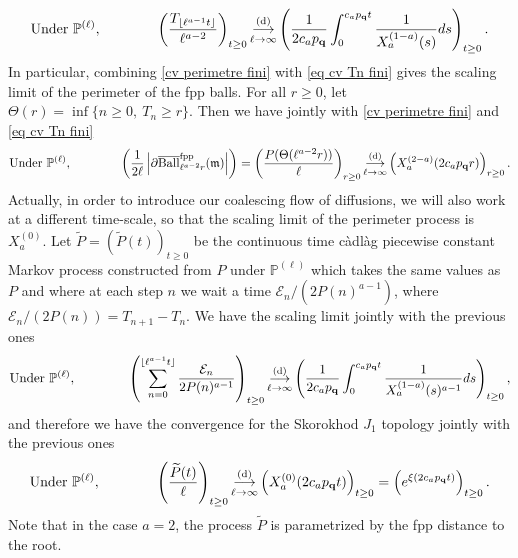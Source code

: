 \documentclass[11pt]{article}
\numberwithin{equation}{section}
\def\P{\mathbb{P}}
\begin{document}
\begin{equation}\label{eq cv Tn fini}
	\text{Under }\P^{(\ell)}, \qquad \qquad
	\left(\frac{T_{\lfloor \ell^{a-1} t \rfloor}}{\ell^{a-2}}
	\right)_{t\ge 0}
	\mathop{\longrightarrow}\limits_{\ell \to \infty}^{(\mathrm{d})}
	\left(\frac{1}{2 c_a p_{\bf q}} \int_0^{c_a p_{\bf q} t} \frac{1}{X^{(1-a)}_a(s)}ds\right)_{t\ge 0}.
\end{equation}
In particular, combining \eqref{cv perimetre fini} with \eqref{eq cv Tn fini} gives the scaling limit of the perimeter of the fpp balls. For all $r\ge 0$, let $\Theta(r)= \inf \{ n \ge 0, \ T_n \ge r\}$. Then we have jointly with \eqref{cv perimetre fini} and \eqref{eq cv Tn fini}
$$
\text{Under }\P^{(\ell)}, \qquad \qquad
\left(
\frac{1}{2\ell}\left\vert\partial\overline{\mathrm{Ball}}^{\mathrm{fpp}}_{\ell^{a-2}r}(\mathfrak{m}) \right\vert
\right)
=
\left(\frac{P(\Theta(\ell^{a-2}r))}{\ell}
\right)_{r\ge 0}
\mathop{\longrightarrow}\limits_{\ell \to \infty}^{(\mathrm{d})}
\left( X^{(2-a)}_a(2c_a p_{\bf q} r)\right)_{r\ge 0}.
$$
Actually, in order to introduce our coalescing flow of diffusions, we will also work at a different time-scale, so that the scaling limit of the perimeter process is $X^{(0)}_a$. Let ${\widetilde{P}=}(\widetilde{P}(t))_{t\ge 0}$ be the continuous time {càdlàg piecewise constant} Markov process constructed from $P$ under $\P^{(\ell)}$ {which takes the same values as $P$ and} where at each step $n$ we wait a time $\mathcal{E}_n/{(2P(n)^{a-1})}$, where $\mathcal{E}_n/(2P(n)) = T_{n+1}-T_n$. We have the scaling limit jointly with the previous ones
$$
\text{Under }\P^{(\ell)}, \qquad \qquad \left(\sum_{n=0}^{\lfloor \ell^{a-1} t\rfloor} \frac{\mathcal{E}_n}{2 P(n)^{a-1}}\right)_{t\ge 0}
\mathop{\longrightarrow}\limits_{\ell \to \infty}^{(\mathrm{d})}
\left(
\frac{1}{2c_a p_{\bf q}} \int_0^{c_a p_{\bf q} t} \frac{1}{X_a^{(1-a)}(s)^{a-1}} ds
\right)_{t\ge 0},
$$
and therefore we have the convergence for the Skorokhod $J_1$ topology jointly with the previous ones
\begin{equation}\label{eq cv Ptilde}
	\text{Under }\P^{(\ell)}, \qquad \qquad \left(\frac{\widetilde{P}(t)}{\ell} \right)_{t\ge 0}
	\mathop{\longrightarrow}\limits_{\ell \to \infty}^{(\mathrm{d})}
	\left(X^{(0)}_{a}(2c_a p_{\bf q}  t) \right)_{t\ge 0}
	=\left(e^{\xi(2c_a p_{\bf q} t)}\right)_{t\ge 0}.
\end{equation}
Note that in the case $a=2$, the process $\widetilde{P}$ is parametrized by the fpp distance to the root.
\end{document}
